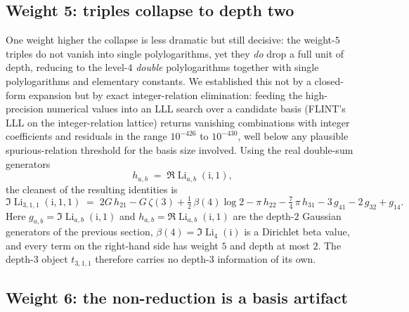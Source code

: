 \documentclass[11pt]{article}
\DeclareMathOperator{\Li}{Li}
\newcommand{\iu}{\mathrm{i}}
\theoremstyle{plain}
\theoremstyle{remark}
\begin{document}
\subsection*{Weight 5: triples collapse to depth two}

One weight higher the collapse is less dramatic but still decisive: the weight-$5$ triples do not vanish into single polylogarithms, yet they \emph{do} drop a full unit of depth, reducing to the level-$4$ \emph{double} polylogarithms together with single polylogarithms and elementary constants. We established this not by a closed-form expansion but by exact integer-relation elimination: feeding the high-precision numerical values into an LLL search over a candidate basis (FLINT's LLL on the integer-relation lattice) returns vanishing combinations with integer coefficients and residuals in the range $10^{-426}$ to $10^{-430}$, well below any plausible spurious-relation threshold for the basis size involved. Using the real double-sum generators
\[
  h_{a,b} \;=\; \Re\Li_{a,b}(\iu,1),
\]
the cleanest of the resulting identities is
\[
  \Im\Li_{3,1,1}(\iu,1,1)
  \;=\; 2G\,h_{21} - G\,\zeta(3) + \tfrac12\,\beta(4)\log 2
        - \pi\,h_{22} - \tfrac{7}{4}\,\pi\,h_{31}
        - 3\,g_{41} - 2\,g_{32} + g_{14}.
\]
Here $g_{a,b}=\Im\Li_{a,b}(\iu,1)$ and $h_{a,b}=\Re\Li_{a,b}(\iu,1)$ are the depth-$2$ Gaussian generators of the previous section, $\beta(4)=\Im\Li_4(\iu)$ is a Dirichlet beta value, and every term on the right-hand side has weight $5$ and depth at most $2$. The depth-$3$ object $t_{3,1,1}$ therefore carries no depth-$3$ information of its own.

\subsection*{Weight 6: the non-reduction is a basis artifact}
\end{document}
